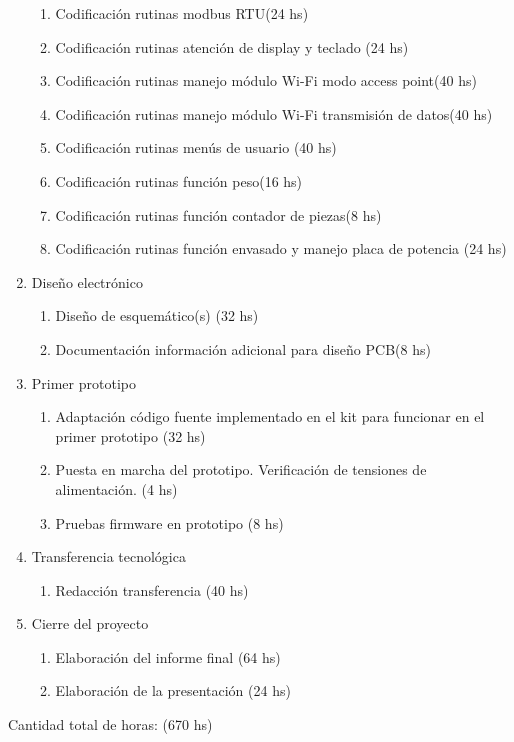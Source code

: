 \documentclass[11pt]{charter}
\begin{document}
\begin{enumerate}
\begin{enumerate}
	\item Codificación rutinas modbus RTU(24 hs)
	\item Codificación rutinas atención de display y teclado (24 hs)
	\item Codificación rutinas manejo módulo Wi-Fi modo access point(40 hs)
	\item Codificación rutinas manejo módulo Wi-Fi transmisión de datos(40 hs)
	\item Codificación rutinas menús de usuario (40 hs)
	\item Codificación rutinas función peso(16 hs)
	\item Codificación rutinas función contador de piezas(8 hs)
	\item Codificación rutinas función envasado y manejo placa de potencia (24 hs)
	\end{enumerate}
\item Diseño electrónico
	\begin{enumerate}
	\item Diseño de esquemático(s) (32 hs)
	\item Documentación información adicional para diseño PCB(8 hs)
	\end{enumerate}	

\item Primer prototipo
	\begin{enumerate}
	\item Adaptación código fuente implementado en el kit para funcionar en el primer prototipo (32 hs)
	\item Puesta en marcha del prototipo. Verificación de tensiones de alimentación. (4 hs)
	\item Pruebas firmware en prototipo (8 hs)
	\end{enumerate}	
\item Transferencia tecnológica
	\begin{enumerate}
	\item Redacción transferencia (40 hs)
	\end{enumerate}		
\item Cierre del proyecto
	\begin{enumerate}
	\item Elaboración del informe final (64 hs)
	\item Elaboración de la presentación (24 hs)
	\end{enumerate}					
\end{enumerate}

Cantidad total de horas: (670 hs)
\end{document}
